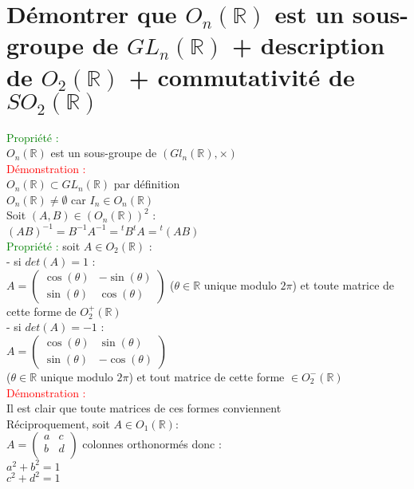 \documentclass{article}
\begin{document}
\section{Démontrer que $O_n(\mathbb R)$ est un sous-groupe de $GL_n(\mathbb R)$ + description de $O_2 (\mathbb R)$ + commutativité de $SO_2(\mathbb R)$}
\textcolor{green}{Propriété :} \\
$O_n(\mathbb R)$ est un sous-groupe de $(Gl_n(\mathbb R),\times )$ \\
\textcolor{red}{Démonstration :} \\
{\boldmath $O_n(\mathbb R) \subset GL_n(\mathbb R)$} par définition \\
{\boldmath $O_n(\mathbb R) \neq \emptyset$} car $I_n \in O_n(\mathbb R)$ \\
Soit {\boldmath $(A,B) \in (O_n(\mathbb R))^2$} : \\
$(AB)^{-1}=B^{-1}A^{-1}={}^tB{}^tA={}^t(AB)$ \\
\textcolor{green}{Propriété :} soit $A\in O_2(\mathbb R)$ : \\
- si $det(A)=1$ : \\
$A=\begin{pmatrix}
\cos(\theta) & -\sin(\theta) \\
\sin(\theta) & \cos(\theta)
\end{pmatrix}$
($\theta \in \mathbb R$ unique modulo $2\pi$)  et toute matrice de cette forme de $O_2^+(\mathbb R)$ \\
- si $det(A)=-1$ : \\
$A=\begin{pmatrix}
\cos(\theta) & \sin(\theta) \\
\sin(\theta) & -\cos(\theta)
\end{pmatrix}$ \\
($\theta \in \mathbb R$ unique modulo $2 \pi$) et tout matrice de cette forme $\in O_2^-(\mathbb R)$ \\
\textcolor{red}{Démonstration :} \\
Il est clair que toute matrices de ces formes conviennent \\
Réciproquement, soit $A\in O_1(\mathbb R) :$ \\
$A=\begin{pmatrix}
a & c \\
b & d \\
\end{pmatrix}$
colonnes orthonormés donc : \\
$a^2+b^2=1$\\
$c^2 +d^2=1$ \\
\end{document}

